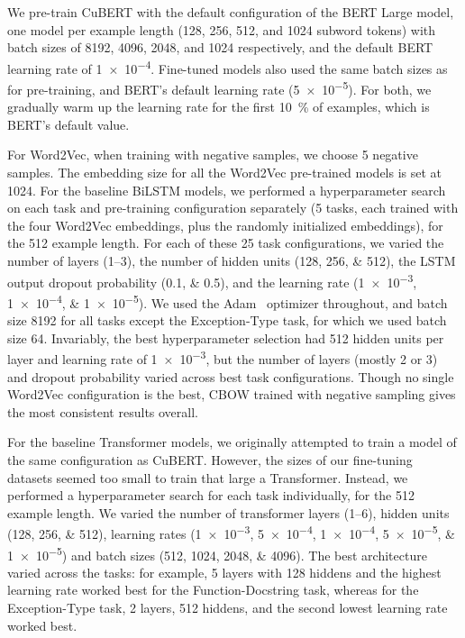 \documentclass{article}
\newcommand{\BERTforCode}{CuBERT\xspace}
\newcommand{\update}[1]{#1}
\begin{document}
We pre-train \BERTforCode with the default configuration of the BERT Large model, one model per example length (\num{128}, \num{256}, \num{512}, and \num{1024} subword tokens) with batch sizes of \num{8192}, \num{4096}, \num{2048}, and \num{1024} respectively, and the default BERT learning rate of \num{1e-4}. Fine-tuned models also used the same batch sizes as for pre-training, and BERT's default learning rate (\num{5e-5}). For both, we gradually warm up the learning rate for the first \SI{10}{\percent} of examples, which is BERT's default value.

For Word2Vec, when training with negative samples, we choose \update{\num{5}} negative samples. The embedding size for all the Word2Vec pre-trained models is set at \num{1024}.
For the baseline BiLSTM models, we performed a hyperparameter search on each task and pre-training configuration separately (\num{5} tasks, each trained with the four Word2Vec embeddings, plus the randomly initialized embeddings), for the \num{512} example length. For each of these \num{25} task configurations, we varied the number of layers (\numrange{1}{3}), the number of hidden units (\numlist{128;256;512}), the LSTM output dropout probability (\numlist{0.1;0.5}),  and the learning rate (\numlist{1e-3;1e-4;1e-5}). We used the Adam~\citep{kingma2014adam} optimizer throughout, and batch size \num{8192} for all tasks except the Exception-Type task, for which we used batch size \num{64}. \update{Invariably, the best hyperparameter selection had \num{512} hidden units per layer and learning rate of \num{1e-3}, but the number of layers (mostly \num{2} or \num{3}) and dropout probability varied across best task configurations.} 
Though no single Word2Vec configuration is the best, CBOW trained with negative sampling gives the most consistent results overall.

For the baseline Transformer models, we originally attempted to train a model of the same configuration as \BERTforCode. However, the sizes of our fine-tuning datasets seemed too small to train that large a Transformer. Instead, we performed a hyperparameter search for each task individually, for the \num{512} example length. We varied the number of transformer layers (\numrange{1}{6}), hidden units (\numlist{128;256;512}), learning rates (\numlist{1e-3;5e-4;1e-4;5e-5;1e-5}) and batch sizes (\numlist{512;1024;2048;4096}). The best architecture varied across the tasks: for example, \num{5} layers with \num{128} hiddens and the highest learning rate worked best for the Function-Docstring task, whereas for the Exception-Type task, \num{2} layers, \num{512} hiddens, and the second lowest learning rate worked best.
\end{document}
